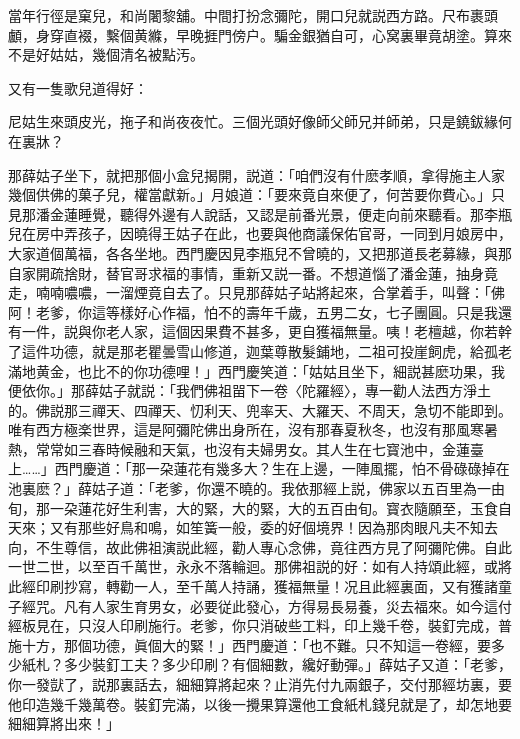 \begin{myquote}
當年行徑是窠兒，和尚闍黎舖。中間打扮念彌陀，開口兒就説西方路。尺布裹頭顱，身穿直裰，繫個黄縧，早晚捱門傍户。騙金銀猶自可，心窝裏畢竟胡塗。算來不是好姑姑，幾個清名被點汚。
\end{myquote}

又有一隻歌兒道得好：

\begin{myquote}
尼姑生來頭皮光，拖子和尚夜夜忙。三個光頭好像師父師兄并師弟，只是鐃鈸緣何在裏牀？
\end{myquote}

那薛姑子坐下，就把那個小盒兒揭開，説道：「咱們沒有什麽孝順，拿得施主人家幾個供佛的菓子兒，權當獻新。」月娘道：「要來竟自來便了，何苦要你費心。」只見那潘金蓮睡覺，聽得外邊有人說話，又認是前番光景，便走向前來聽看。那李瓶兒在房中弄孩子，因曉得王姑子在此，也要與他商議保佑官哥，一同到月娘房中，大家道個萬福，各各坐地。西門慶因見李瓶兒不曾曉的，又把那道長老募緣，與那自家開疏捨財，替官哥求福的事情，重新又説一番。不想道惱了潘金蓮，抽身竟走，喃喃噥噥，一溜煙竟自去了。只見那薛姑子站將起來，合掌着手，叫聲：「佛阿！老爹，你這等樣好心作福，怕不的壽年千歲，五男二女，七子團圓。只是我還有一件，説與你老人家，這個因果費不甚多，更自獲福無量。咦！老檀越，你若幹了這件功德，就是那老瞿曇雪山修道，迦葉尊散髮鋪地，二祖可投崖飼虎，給孤老滿地黄金，也比不的你功德哩！」西門慶笑道：「姑姑且坐下，細説甚麽功果，我便依你。」那薛姑子就説：「我們佛祖㽞下一卷〈陀羅經〉，專一勸人法西方淨土的。佛説那三禪天、四禪天、忉利天、兜率天、大羅天、不周天，急切不能即到。唯有西方極楽世界，這是阿彌陀佛出身所在，沒有那春夏秋冬，也沒有那風寒暑熱，常常如三春時候融和天氣，也沒有夫婦男女。其人生在七寳池中，金蓮臺上……」西門慶道：「那一朶蓮花有幾多大？生在上邊，一陣風擺，怕不骨碌碌掉在池裏麽？」薛姑子道：「老爹，你還不曉的。我依那經上説，佛家以五百里為一由旬，那一朶蓮花好生利害，大的緊，大的緊，大的五百由旬。寳衣隨願至，玉食自天來；又有那些好鳥和鳴，如笙簧一般，委的好個境界！因為那肉眼凡夫不知去向，不生尊信，故此佛祖演説此經，勸人專心念佛，竟往西方見了阿彌陀佛。自此一世二世，以至百千萬世，永永不落輪迴。那佛祖説的好：如有人持頌此經，或將此經印刷抄寫，轉勸一人，至千萬人持誦，獲福無量！况且此經裏面，又有獲諸童子經咒。凡有人家生育男女，必要従此發心，方得易長易養，災去福來。如今這付經板見在，只沒人印刷施行。老爹，你只消破些工料，印上幾千卷，裝釘完成，普施十方，那個功德，眞個大的緊！」西門慶道：「也不難。只不知這一卷經，要多少紙札？多少裝釘工夫？多少印刷？有個細數，纔好動彈。」薛姑子又道：「老爹，你一發獃了，説那裏話去，細細算將起來？止消先付九兩銀子，交付那經坊裏，要他印造幾千幾萬卷。裝釘完滿，以後一攪果算還他工食紙札錢兒就是了，却怎地要細細算將出來！」

